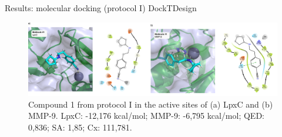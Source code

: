 \documentclass[aspectratio=169,xcolor=dvipsnames]{beamer}
\begin{document}



\begin{frame}{Results: molecular docking (protocol I) \hfill {\footnotesize \alert{DockTDesign}}}
    \begin{figure}
        \centering
        \includegraphics[width=1\textwidth]{imgs/results/figure-compound1-protocol1-h.png}
        \caption{Compound 1 from protocol I in the active sites of (a) LpxC and (b) MMP-9. LpxC: -12{,}176 kcal/mol; MMP-9: -6{,}795 kcal/mol; QED: 0{,}836; SA: 1{,}85; Cx: 111{,}781.}
    \end{figure}
\end{frame}


\end{document}

